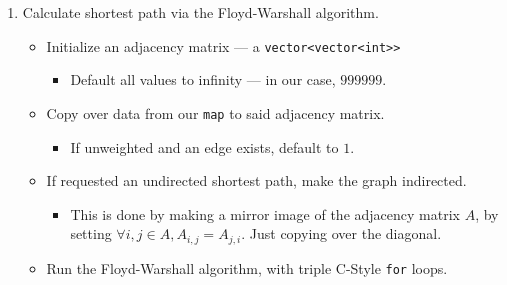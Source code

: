 \documentclass{article}
\newcommand{\shellcmd}[1]{\texttt{\colorbox{gray!30}{#1}}}
\begin{document}
\begin{enumerate}
    \item Calculate shortest path via the Floyd-Warshall algorithm.
    \begin{itemize}
        \item Initialize an adjacency matrix --- a \shellcmd{vector<vector<int>>}
        \begin{itemize}
            \item Default all values to infinity --- in our case, $999999$.
        \end{itemize}
        \item Copy over data from our \shellcmd{map} to said adjacency matrix.
        \begin{itemize}
            \item If unweighted and an edge exists, default to $1$.
        \end{itemize}
        \item If requested an undirected shortest path, make the graph indirected.
        \begin{itemize}
            \item This is done by making a mirror image of the adjacency matrix $A$, by setting $\forall i, j \in A, A_{i, j} = A_{j, i}$. Just copying over the diagonal.
        \end{itemize}
        \item Run the Floyd-Warshall algorithm, with triple C-Style \shellcmd{for} loops.
    \end{itemize}
\end{enumerate}
\end{document}
